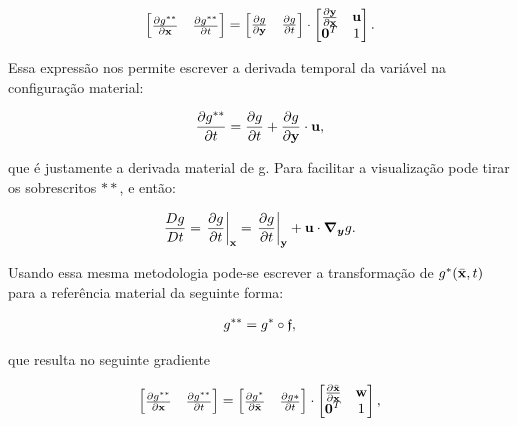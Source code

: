 \documentclass[tese_patricia]{subfiles}%
\begin{document}
\begin{align}
	\begin{bmatrix}
		\frac{\partial {g^{**}}}{\partial {\mathbf{x}}} & \frac{\partial {g^{**}}}{\partial t} \\
	\end{bmatrix}
	=
	\begin{bmatrix}
		\frac{\partial {g}}{\partial \mathbf{y}} & \frac{\partial {g}}{\partial t} 
	\end{bmatrix}
	\cdot
	\begin{bmatrix}
		\frac{\partial {\mathbf{y}}}{\partial {\mathbf{x}}} & \mathbf{u} \\
		\mathbf{0}^T & 1 \\
	\end{bmatrix} .
\end{align}

Essa expressão nos permite escrever a derivada temporal da variável na configuração material:

\begin{align}
	\frac{\partial g^{**}}{\partial t} = \frac{\partial g}{\partial t} + \frac{\partial g}{\partial \mathbf{y}} \cdot \mathbf{u}, 
\end{align}

\noindent que é justamente a derivada material de g. Para facilitar a visualização pode tirar os sobrescritos $**$, e então:

\begin{align}
	\frac{Dg}{Dt} = \left . \frac{\partial g}{\partial t} \right|_{\mathbf{x}} = \left . \frac{\partial g}{\partial t} \right|_{\mathbf{y}} + \mathbf{u} \cdot \boldsymbol{\nabla_y} g. \label{eq:der_mat}
\end{align}

Usando essa mesma metodologia pode-se escrever a transformação de $g^{*}(\bar{\mathbf{x}},t)$ para a referência material da seguinte forma:


\begin{align}
	g^{**} = g^{*}  \circ \mathfrak{f},
\end{align}

\noindent que resulta no seguinte gradiente

\begin{align}
	\begin{bmatrix}
		\frac{\partial {g^{**}}}{\partial {\mathbf{x}}} & \frac{\partial {g^{**}}}{\partial t} \\
	\end{bmatrix}
	=
	\begin{bmatrix}
		\frac{\partial {g^*}}{\partial \bar{\mathbf{x}}} & \frac{\partial {g*}}{\partial t} 
	\end{bmatrix}
	\cdot
	\begin{bmatrix}
		\frac{\partial {\bar{\mathbf{x}}}}{\partial {\mathbf{x}}} & \mathbf{w} \\
		\mathbf{0}^T & 1 \\
	\end{bmatrix},
\end{align}
\end{document}
